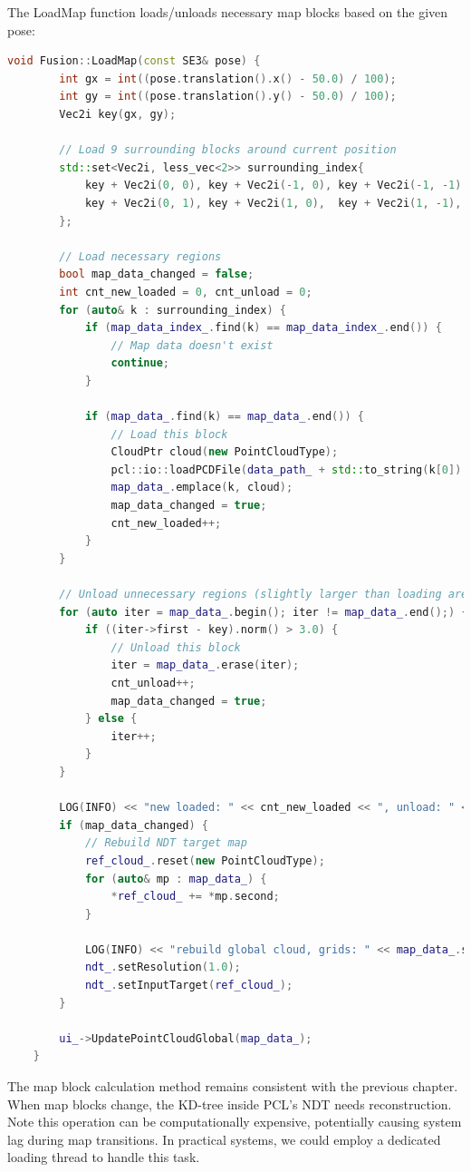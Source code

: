 The LoadMap function loads/unloads necessary map blocks based on the given pose:

\begin{lstlisting}[language=c++,caption=/ch10/fusion.cc]
	void Fusion::LoadMap(const SE3& pose) {
		int gx = int((pose.translation().x() - 50.0) / 100);
		int gy = int((pose.translation().y() - 50.0) / 100);
		Vec2i key(gx, gy);
		
		// Load 9 surrounding blocks around current position
		std::set<Vec2i, less_vec<2>> surrounding_index{
			key + Vec2i(0, 0), key + Vec2i(-1, 0), key + Vec2i(-1, -1), key + Vec2i(-1, 1), key + Vec2i(0, -1),
			key + Vec2i(0, 1), key + Vec2i(1, 0),  key + Vec2i(1, -1),  key + Vec2i(1, 1),
		};
		
		// Load necessary regions
		bool map_data_changed = false;
		int cnt_new_loaded = 0, cnt_unload = 0;
		for (auto& k : surrounding_index) {
			if (map_data_index_.find(k) == map_data_index_.end()) {
				// Map data doesn't exist
				continue;
			}
			
			if (map_data_.find(k) == map_data_.end()) {
				// Load this block
				CloudPtr cloud(new PointCloudType);
				pcl::io::loadPCDFile(data_path_ + std::to_string(k[0]) + "_" + std::to_string(k[1]) + ".pcd", *cloud);
				map_data_.emplace(k, cloud);
				map_data_changed = true;
				cnt_new_loaded++;
			}
		}
		
		// Unload unnecessary regions (slightly larger than loading area to avoid frequent unloading)
		for (auto iter = map_data_.begin(); iter != map_data_.end();) {
			if ((iter->first - key).norm() > 3.0) {
				// Unload this block
				iter = map_data_.erase(iter);
				cnt_unload++;
				map_data_changed = true;
			} else {
				iter++;
			}
		}
		
		LOG(INFO) << "new loaded: " << cnt_new_loaded << ", unload: " << cnt_unload;
		if (map_data_changed) {
			// Rebuild NDT target map
			ref_cloud_.reset(new PointCloudType);
			for (auto& mp : map_data_) {
				*ref_cloud_ += *mp.second;
			}
			
			LOG(INFO) << "rebuild global cloud, grids: " << map_data_.size();
			ndt_.setResolution(1.0);
			ndt_.setInputTarget(ref_cloud_);
		}
		
		ui_->UpdatePointCloudGlobal(map_data_);
	}
\end{lstlisting}

The map block calculation method remains consistent with the previous chapter. When map blocks change, the KD-tree inside PCL's NDT needs reconstruction. Note this operation can be computationally expensive, potentially causing system lag during map transitions. In practical systems, we could employ a dedicated loading thread to handle this task.

